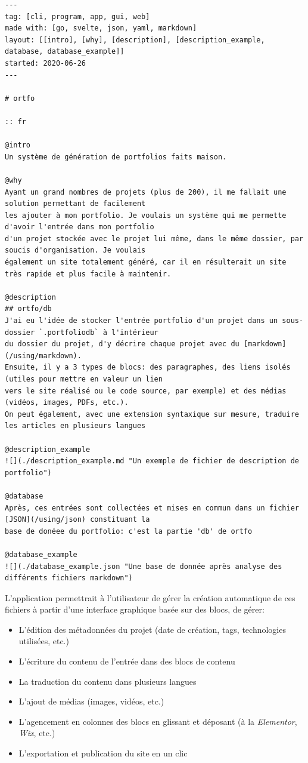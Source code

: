 \documentclass{article}
\begin{document}
    \begin{verbatim}
---
tag: [cli, program, app, gui, web]
made with: [go, svelte, json, yaml, markdown]
layout: [[intro], [why], [description], [description_example, database, database_example]]
started: 2020-06-26
---

# ortfo

:: fr

@intro
Un système de génération de portfolios faits maison.

@why
Ayant un grand nombres de projets (plus de 200), il me fallait une solution permettant de facilement 
les ajouter à mon portfolio. Je voulais un système qui me permette d'avoir l'entrée dans mon portfolio 
d'un projet stockée avec le projet lui même, dans le même dossier, par soucis d'organisation. Je voulais 
également un site totalement généré, car il en résulterait un site très rapide et plus facile à maintenir.

@description
## ortfo/db
J'ai eu l'idée de stocker l'entrée portfolio d'un projet dans un sous-dossier `.portfoliodb` à l'intérieur 
du dossier du projet, d'y décrire chaque projet avec du [markdown](/using/markdown).
Ensuite, il y a 3 types de blocs: des paragraphes, des liens isolés (utiles pour mettre en valeur un lien 
vers le site réalisé ou le code source, par exemple) et des médias (vidéos, images, PDFs, etc.).
On peut également, avec une extension syntaxique sur mesure, traduire les articles en plusieurs langues

@description_example
![](./description_example.md "Un exemple de fichier de description de portfolio")

@database
Après, ces entrées sont collectées et mises en commun dans un fichier [JSON](/using/json) constituant la 
base de donéee du portfolio: c'est la partie 'db' de ortfo

@database_example
![](./database_example.json "Une base de donnée après analyse des différents fichiers markdown")
    \end{verbatim}

L'application permettrait à l'utilisateur de gérer la création automatique de ces fichiers à partir d'une interface graphique basée sur des blocs, de gérer:

\begin{itemize}
    \item L'édition des métadonnées du projet (date de création, tags, technologies utilisées, etc.)
    \item L'écriture du contenu de l'entrée dans des blocs de contenu
    \item La traduction du contenu dans plusieurs langues
    \item L'ajout de médias (images, vidéos, etc.)
    \item L'agencement en colonnes des blocs en glissant et déposant (à la \emph{Elementor}, \emph{Wix}, etc.)
    \item L'exportation et publication du site en un clic
\end{itemize}
\end{document}
